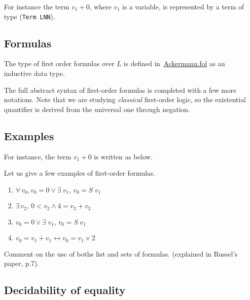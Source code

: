 For instance the term $v_1+0$, where $v_1$ is a variable,
is represented by a term of type (\texttt{Term LNN}).


\subsection{Formulas}



The type of first order formulas over $L$ is defined 
in~\href{../theories/html/hydras.Ackermann.fol.html}{Ackermann.fol} as an inductive data type.


The full abstract syntax of first-order formulas is completed 
with a few more notations. Note that we are studying \emph{classical} first-order logic, so the existential quantifier is derived from the universal one through negation. 


\subsection{Examples}


For instance, the term $v_1+0$ is written as below.


Let us give a few examples of first-order formulas.

\label{fol:examplesf1f2f3}
\begin{enumerate}
\item $\forall\,v_0, v_0=0 \vee \exists\;v_1,\, v_0= S\;v_1$
\item $\exists\,v_2,\, 0< v_2 \wedge 4=v_2+v_2$
\item $ v_0=0 \vee \exists\;v_1,\, v_0= S\;v_1$
\item $v_0= v_1 + v_1 \leftrightarrow v_0 = v_1 \times 2$
\end{enumerate}



\begin{todo}
Comment on the use of boths list and sets of formulas.
(explained in Russel's paper, p.7).


\end{todo}


\subsection{Decidability of equality}

